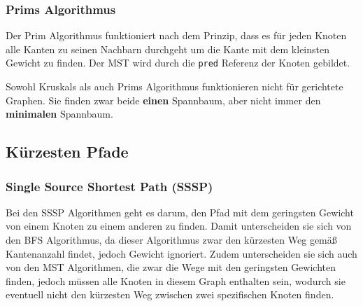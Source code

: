 \documentclass[
../../AuD-Zusammenfassung.tex,
]
{subfiles}
\begin{document}
\subsubsection{Prims Algorithmus}
Der Prim Algorithmus funktioniert nach dem Prinzip, dass es für jeden Knoten alle Kanten zu seinen Nachbarn durchgeht um die Kante mit dem kleinsten Gewicht zu finden. Der MST wird durch die \texttt{pred} Referenz der Knoten gebildet.\\
\begin{algorithm} [H]
\end{algorithm}
Sowohl Kruskals als auch Prims Algorithmus funktionieren nicht für gerichtete Graphen. Sie finden zwar beide \textbf{einen} Spannbaum, aber nicht immer den \textbf{minimalen} Spannbaum.


\newpage
\subsection{Kürzesten Pfade}
\subsubsection{Single Source Shortest Path (SSSP)}
Bei den SSSP Algorithmen geht es darum, den Pfad mit dem geringsten Gewicht von einem Knoten zu einem anderen zu finden. Damit unterscheiden sie sich von den BFS Algorithmus, da dieser Algorithmus zwar den kürzesten Weg gemäß Kantenanzahl findet, jedoch Gewicht ignoriert. Zudem unterscheiden sie sich auch von den MST Algorithmen, die zwar die Wege mit den geringsten Gewichten finden, jedoch müssen alle Knoten in diesem Graph enthalten sein, wodurch sie eventuell nicht den kürzesten Weg zwischen zwei spezifischen Knoten finden.
\end{document}
